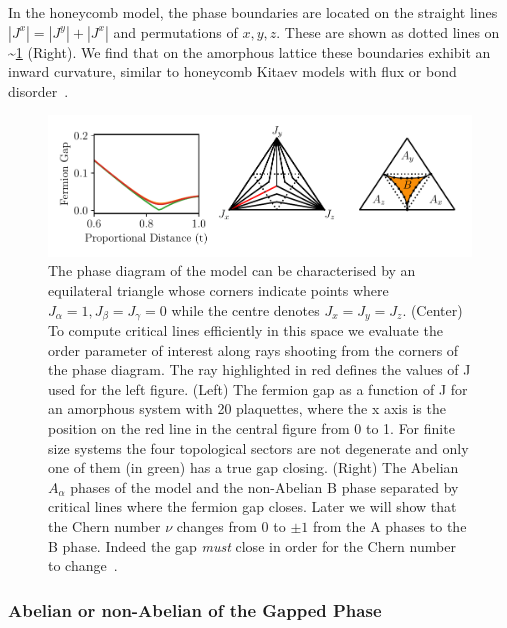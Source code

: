 In the honeycomb model, the phase boundaries are located on the straight lines \(|J^x| = |J^y| + |J^x|\) and permutations of \(x,y,z\). These are shown as dotted lines on \textasciitilde{}\cref{fig:phase_diagram} (Right). We find that on the amorphous lattice these boundaries exhibit an inward curvature, similar to honeycomb Kitaev models with flux or bond disorder~\autocite{knolle_dynamics_2016,Nasu_Thermal_2015,lahtinenPerturbedVortexLattices2014,willansDisorderQuantumSpin2010,zschockePhysicalStatesFinitesize2015,kaoDisorderDisorderLocalization2021}.

\hypertarget{fig:phase_diagram}{%
\begin{figure}
\centering
\includegraphics[width=1\textwidth,height=\textheight]{figure_code/amk_chapter/results/phase_diagram/phase_diagram}
\caption[{The Ground State Phase Diagram}]{The phase diagram of the model can be characterised by an equilateral triangle whose corners indicate points where \(J_\alpha = 1, J_\beta = J_\gamma = 0\) while the centre denotes \(J_x = J_y = J_z\). (Center) To compute critical lines efficiently in this space we evaluate the order parameter of interest along rays shooting from the corners of the phase diagram. The ray highlighted in red defines the values of J used for the left figure. (Left) The fermion gap as a function of J for an amorphous system with 20 plaquettes, where the x axis is the position on the red line in the central figure from 0 to 1. For finite size systems the four topological sectors are not degenerate and only one of them (in green) has a true gap closing. (Right) The Abelian \(A_\alpha\) phases of the model and the non-Abelian B phase separated by critical lines where the fermion gap closes. Later we will show that the Chern number \(\nu\) changes from \(0\) to \(\pm 1\) from the A phases to the B phase. Indeed the gap \emph{must} close in order for the Chern number to change~\autocite{ezawaTopologicalPhaseTransition2013}.}
\label{fig:phase_diagram}
\end{figure}
}

\hypertarget{abelian-or-non-abelian-of-the-gapped-phase}{%
\subsubsection{Abelian or non-Abelian of the Gapped Phase}\label{abelian-or-non-abelian-of-the-gapped-phase}}

